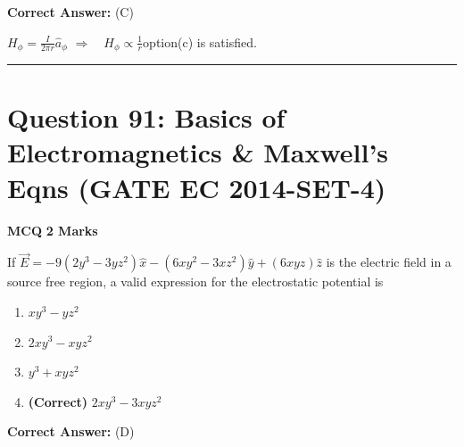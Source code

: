 \documentclass[11pt,a4paper]{article}
\begin{document}
\noindent \textbf{Correct Answer:} (C)

\begin{tcolorbox}[solbox, title=Detailed Solution -- Question 90]
$H_{\phi}=\frac{I}{2 \pi r} \hat{a}_{\phi}$
$\Rightarrow \quad H_{\phi} \propto \frac{1}{r}$option(c) is satisfied.
\end{tcolorbox}

\vspace{1.5em}
\hrule
\vspace{1.5em}

\section*{Question 91: Basics of Electromagnetics \& Maxwell's Eqns (GATE EC 2014-SET-4)}
\noindent \textbf{\color{primary}MCQ} \hfill \textbf{\color{secondary}2 Marks}


\noindent If $\vec{E}=-9(2y^{3}-3yz^{2})\hat{x}-(6xy^{2}-3xz^{2})\hat{y}+(6xyz)\hat{z}$ is the electric field in a source free region, a valid expression for the electrostatic potential is


\begin{enumerate}[label=(\Alph*)]
    \item $xy^{3}-yz^{2}$
    \item $2xy^{3}-xyz^{2}$
    \item $y^{3}+xyz^{2}$
    \item \textbf{(Correct)} $2xy^{3}-3xyz^{2}$
\end{enumerate}

\noindent \textbf{Correct Answer:} (D)
\end{document}
